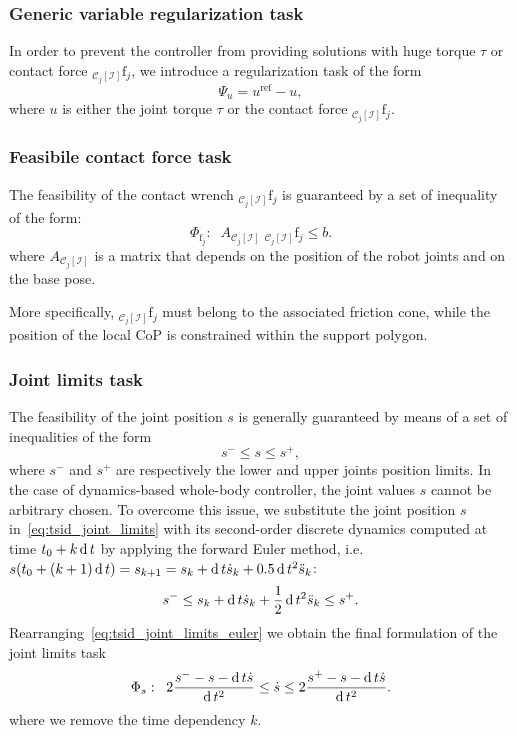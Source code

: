 \subsubsection{Generic variable regularization task}
In order to prevent the controller from providing solutions with huge torque $\tau$ or contact force ${}_{\mathcal{C}_j[\mathcal{I}]}\mathrm{f}_j$, we introduce a regularization task of the form
\begin{equation}
    \label{eq:tsid_generic_regularization}
    \Psi_u = u^\text{ref} - u,
\end{equation}
where $u$ is either the joint torque $\tau$ or the contact force ${}_{\mathcal{C}_j[\mathcal{I}]}\mathrm{f}_j$.

\subsubsection{Feasibile contact force task}
The feasibility of the contact wrench ${}_{\mathcal{C}_j[\mathcal{I}]}\mathrm{f}_j$ is guaranteed by a set of inequality of the form:
\begin{equation}
  \Phi_{\mathrm{f}_j}: \;\;  \label{eq:tsid_contact_wrench_feasibility_constraint}
    A_{\mathcal{C}_j[\mathcal{I}]} \; {}_{\mathcal{C}_j[\mathcal{I}]}\mathrm{f}_j \le b.
\end{equation}
where $A_{\mathcal{C}_j[\mathcal{I}]}$ is a matrix that depends on the position of the robot joints and on the base pose.
\par
More specifically, ${}_{\mathcal{C}_j[\mathcal{I}]}\mathrm{f}_j$ must belong to the associated friction cone, while the position of the local CoP is constrained within the support polygon. 

\subsubsection{Joint limits task}
The feasibility of the joint position $s$ is generally guaranteed by means of a set of inequalities of the form 
\begin{equation}
\label{eq:tsid_joint_limits}
    s^- \le s \le s^+,
\end{equation}
where $s^-$ and $s^+$ are respectively the lower and upper joints position limits. 
In the case of dynamics-based whole-body controller, the joint values $s$ cannot be arbitrary chosen. To overcome this issue, we substitute the joint position $s$ in~\eqref{eq:tsid_joint_limits} with its second-order discrete dynamics computed at time $t_0 + k \operatorname{d} t$ by applying the forward Euler method, i.e. $s(t_0 + (k+1) \operatorname{d} t) = s_{k+1} = s_k + \operatorname{d} t \dot{s}_k + 0.5 \operatorname{d} t^2 \ddot{s}_k$:
\begin{equation}
\label{eq:tsid_joint_limits_euler}
    s^- \le  s_k + \operatorname{d} t \dot{s}_k + \frac{1}{2} \operatorname{d} t^2 \ddot{s}_k \le s^+.
\end{equation}
Rearranging~\eqref{eq:tsid_joint_limits_euler} we obtain the final formulation of the joint limits task
\begin{equation}
   \Phi_s :  \;\; 2 \frac{s^-  -s - \operatorname{d} t \dot{s} }{\operatorname{d} t^2} \le   \dot{s} \le 2 \frac{s^+  -s - \operatorname{d} t \dot{s}}{\operatorname{d} t^2}.
\end{equation}
where we remove the time dependency $k$.
